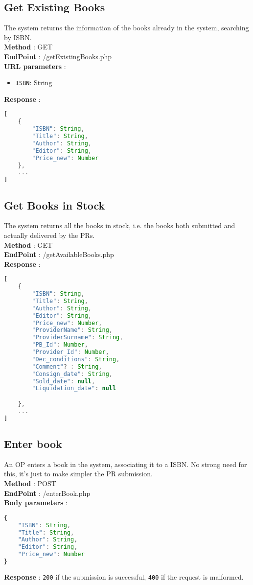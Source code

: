 \subsection{Get Existing Books}
The system returns the information of the books already in the system, searching by ISBN.\\
\textbf{Method} : GET \\
\textbf{EndPoint} : /getExistingBooks.php \\
\textbf{URL parameters} :
\begin{itemize}
    \item \texttt{ISBN}: String
\end{itemize}
\textbf{Response} :
\begin{lstlisting}[language=JavaScript, label={lst:jscode}, basicstyle=\ttfamily]
[
    {
        "ISBN": String,
        "Title": String,
        "Author": String,
        "Editor": String,
        "Price_new": Number
    },
    ...
]
\end{lstlisting}

\subsection{Get Books in Stock}
The system returns all the books in stock, i.e. the books both submitted and actually delivered by the PRs.\\
\textbf{Method} : GET \\
\textbf{EndPoint} : /getAvailableBooks.php \\
\textbf{Response} :
\begin{lstlisting}[language=JavaScript, label={lst:jscode}, basicstyle=\ttfamily]
[
    {
        "ISBN": String,
        "Title": String,
        "Author": String,
        "Editor": String,
        "Price_new": Number,
        "ProviderName": String,
        "ProviderSurname": String,
        "PB_Id": Number,
        "Provider_Id": Number,
        "Dec_conditions": String,
        "Comment"? : String,
        "Consign_date": String,
        "Sold_date": null, 
        "Liquidation_date": null

    },
    ...
]
\end{lstlisting}

\subsection{Enter book}
An OP enters a book in the system, associating it to a ISBN. No strong need for this, it's just to make simpler the PR submission.\\
\textbf{Method} : POST \\
\textbf{EndPoint} : /enterBook.php \\
\textbf{Body parameters} :
\begin{lstlisting}[language=JavaScript, label={lst:jscode}, basicstyle=\ttfamily]
{
    "ISBN": String,
    "Title": String,
    "Author": String,
    "Editor": String,
    "Price_new": Number
}
\end{lstlisting}
\textbf{Response} : \texttt{200} if the submission is successful, \texttt{400} if the request is malformed.

